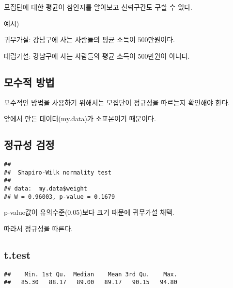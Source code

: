 \documentclass[
]{article}
\newenvironment{Shaded}{\begin{snugshade}}{\end{snugshade}}
\newcommand{\FunctionTok}[1]{\textcolor[rgb]{0.00,0.00,0.00}{#1}}
\newcommand{\NormalTok}[1]{#1}
\newcommand{\SpecialCharTok}[1]{\textcolor[rgb]{0.00,0.00,0.00}{#1}}
\begin{document}
모집단에 대한 평균이 참인지를 알아보고 신뢰구간도 구할 수 있다.

예시)

귀무가설: 강남구에 사는 사람들의 평균 소득이 500만원이다.

대립가설: 강남구에 사는 사람들의 평균 소득이 500만원이 아니다.

\hypertarget{uxbaa8uxc218uxc801-uxbc29uxbc95}{%
\subsection{모수적 방법}\label{uxbaa8uxc218uxc801-uxbc29uxbc95}}

모수적인 방법을 사용하기 위해서는 모집단이 정규성을 따르는지 확인해야 한다.

앞에서 만든 데이터(my.data)가 소표본이기 때문이다.

\hypertarget{uxc815uxaddcuxc131-uxac80uxc815}{%
\subsection{정규성 검정}\label{uxc815uxaddcuxc131-uxac80uxc815}}

\begin{Shaded}
\end{Shaded}

\begin{verbatim}
## 
##  Shapiro-Wilk normality test
## 
## data:  my.data$weight
## W = 0.96003, p-value = 0.1679
\end{verbatim}

p-value값이 유의수준(0.05)보다 크기 때문에 귀무가설 채택.

따라서 정규성을 따른다.

\hypertarget{t.test}{%
\subsection{t.test}\label{t.test}}

\begin{Shaded}
\end{Shaded}

\begin{verbatim}
##    Min. 1st Qu.  Median    Mean 3rd Qu.    Max. 
##   85.30   88.17   89.00   89.17   90.15   94.80
\end{verbatim}
\end{document}
